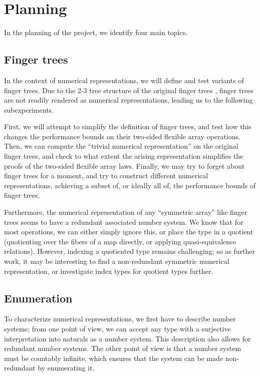 \documentclass{article}
\theoremstyle{plain}%
\theoremstyle{definition}
\begin{document}
\section{Planning}\label{sec:planning}
In the planning of the project, we identify four main topics.

\subsection{Finger trees}
In the context of numerical representations, we will define and test variants of finger trees. Due to the 2-3 tree structure of the original finger trees \cite{fingertrees}, finger trees are not readily rendered as numerical representations, leading us to the following subexperiments.

First, we will attempt to simplify the definition of finger trees, and test how this changes the performance bounds on their two-sided flexible array operations. Then, we can compute the ``trivial numerical representation'' on the original finger trees, and check to what extent the arising representation simplifies the proofs of the two-sided flexible array laws. Finally, we may try to forget about finger trees for a moment, and try to construct different numerical representations, achieving a subset of, or ideally all of, the performance bounds of finger trees.

Furthermore, the numerical representation of any ``symmetric array'' like finger trees seems to have a redundant associated number system. We know that for most operations, we can either simply ignore this, or place the type in a quotient (quotienting over the fibers of a map directly, or applying quasi-equivalence relations). However, indexing a quotiented type remains challenging; so  as further work, it may be interesting to find a non-redundant symmetric numerical representation, or investigate index types for quotient types further.

\subsection{Enumeration}
To characterize numerical representations, we first have to describe number systems; from one point of view, we can accept any type with a surjective interpretation into naturals as a number system. This description also allows for redundant number systems. The other point of view is that a number system must be countably infinite, which ensures that the system can be made non-redundant by enumerating it.
\end{document}
